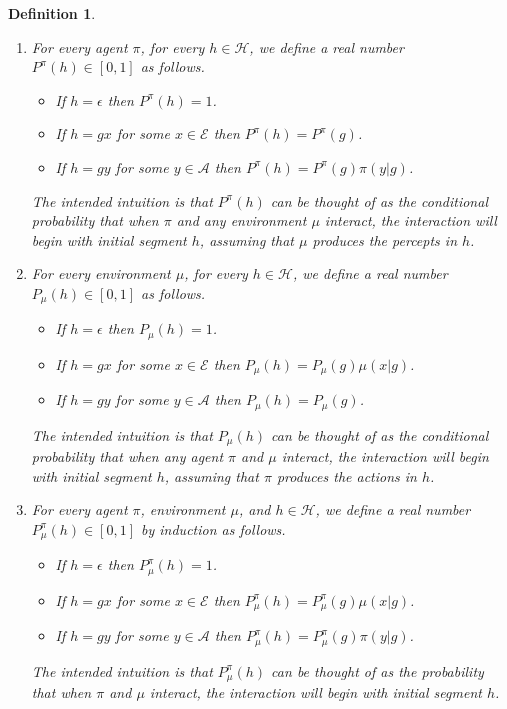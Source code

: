 \documentclass[twoside]{article}
\newtheorem{definition}[theorem]{Definition}
\begin{document}
\begin{definition}
\label{pullbackdef}
    \begin{enumerate}
        \item
        For every agent $\pi$, for every $h\in\mathcal H$, we define a real number
        $P^\pi(h)\in[0,1]$ as follows.
        \begin{itemize}
            \item
            If $h=\epsilon$ then $P^\pi(h)=1$.
            \item
            If $h=gx$ for some $x\in\mathcal E$ then $P^\pi(h)=P^\pi(g)$.
            \item
            If $h=gy$ for some $y\in\mathcal A$ then $P^\pi(h)=P^\pi(g)\pi(y|g)$.
        \end{itemize}
        The intended intuition is that $P^\pi(h)$ can be thought of as the
        conditional probability that when $\pi$
        and any environment
        $\mu$ interact, the interaction will begin with initial segment
        $h$, \emph{assuming}
        that $\mu$ produces the percepts in $h$.
        \item
        For every environment $\mu$, for every $h\in\mathcal H$, we define a real number
        $P_\mu(h)\in[0,1]$ as follows.
        \begin{itemize}
            \item
            If $h=\epsilon$ then $P_\mu(h)=1$.
            \item
            If $h=gx$ for some $x\in\mathcal E$ then $P_\mu(h)=P_\mu(g)\mu(x|g)$.
            \item
            If $h=gy$ for some $y\in\mathcal A$ then $P_\mu(h)=P_\mu(g)$.
        \end{itemize}
        The intended intuition is that $P_\mu(h)$ can be thought of as the
        conditional probability that when any agent $\pi$ and $\mu$ interact,
        the interaction will begin with initial segment $h$, \emph{assuming} that
        $\pi$ produces the actions in $h$.
        \item
        For every agent $\pi$, environment $\mu$, and $h\in\mathcal H$, we define a
        real number $P^\pi_\mu(h)\in[0,1]$ by induction as follows.
        \begin{itemize}
            \item
            If $h=\epsilon$ then $P^\pi_\mu(h)=1$.
            \item
            If $h=gx$ for some $x\in\mathcal E$ then
            $P^\pi_\mu(h)=P^\pi_\mu(g)\mu(x|g)$.
            \item
            If $h=gy$ for some $y\in\mathcal A$ then
            $P^\pi_\mu(h)=P^\pi_\mu(g)\pi(y|g)$.
        \end{itemize}
        The intended intuition is that $P^\pi_\mu(h)$ can be thought of as
        the probability that when $\pi$ and $\mu$ interact, the interaction
        will begin with initial segment $h$.
    \end{enumerate}
\end{definition}
\end{document}
